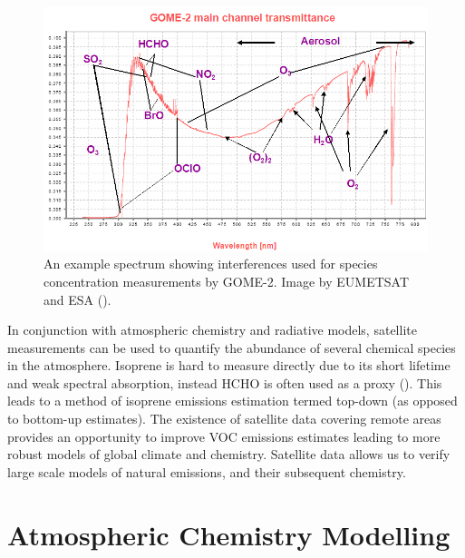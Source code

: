       \begin{figure}
        \includegraphics[width=\textwidth]{Figures/GOME_SPECTRUM.jpg}
        \caption{%
          An example spectrum showing interferences used for species concentration measurements by GOME-2. Image by EUMETSAT and ESA (\cite{GOME2Image}).
          }
        \label{LR:HCHO:Sat:fig_GOME_products}
      \end{figure}
      
      In conjunction with atmospheric chemistry and radiative models, satellite measurements can be used to quantify the abundance of several chemical species in the atmosphere.
      Isoprene is hard to measure directly due to its short lifetime and weak spectral absorption, instead HCHO is often used as a proxy (\cite{Millet2006, Fu2007, Dufour2009, Marais2012, bauwens2013satellite, Kefauver2014, Bauwens2016}).
      This leads to a method of isoprene emissions estimation termed top-down (as opposed to bottom-up estimates).
      The existence of satellite data covering remote areas provides an opportunity to improve VOC emissions estimates leading to more robust models of global climate and chemistry. 
      Satellite data allows us to verify large scale models of natural emissions, and their subsequent chemistry.
  

  
\section{Atmospheric Chemistry Modelling}
\label{LR:Models}
  
